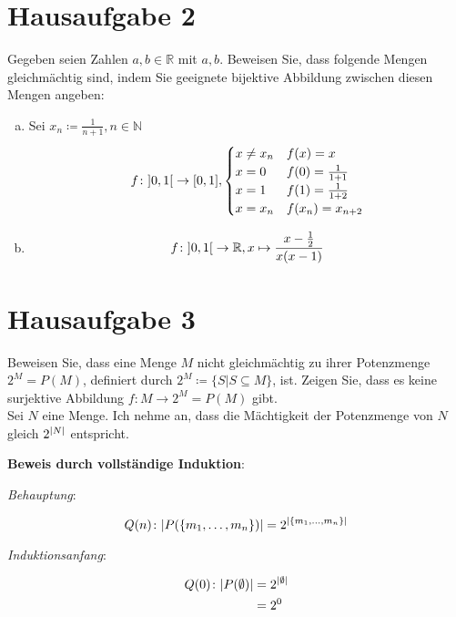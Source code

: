 \documentclass{article}
\begin{document}
\section*{Hausaufgabe 2}

Gegeben seien Zahlen $a, b \in \mathbb{R}$ mit $a , b$. Beweisen Sie, dass folgende Mengen gleichmächtig sind, indem
Sie geeignete bijektive Abbildung zwischen diesen Mengen angeben:

\begin{enumerate}[a)]
\item
  Sei $x_n \coloneqq \frac{1}{n+1}, n \in \mathbb{N}$
  \[
    f \colon \interval[open]{0}{1} \to \interval{0}{1}, \begin{cases}
      x \ne x_n & f(x) = x \\
      x = 0 & f(0) = \frac{1}{1 + 1} \\
      x = 1 & f(1) = \frac{1}{1 + 2} \\
      x = x_n & f(x_n) = x_{n+2}
    \end{cases}
  \]
\item
  \[
    f \colon \interval[open]{0}{1} \to \mathbb{R}, x \mapsto \frac{x-\frac{1}{2}}{x(x - 1)}
  \]
\end{enumerate}


\section*{Hausaufgabe 3}

Beweisen Sie, dass eine Menge $M$ nicht gleichmächtig zu ihrer Potenzmenge $2^M = P(M)$, definiert durch
$2^M \coloneqq \{ S | S \subseteq M \}$, ist. Zeigen Sie, dass es keine surjektive Abbildung
$f \colon M \to 2^M = P(M)$ gibt. \\

Sei $N$ eine Menge. Ich nehme an, dass die Mächtigkeit der Potenzmenge von $N$ gleich $2^{\abs{N}}$ entspricht.

\textbf{Beweis durch vollständige Induktion}:

\emph{Behauptung}:

\[
  Q(n) \colon \abs{P(\{m_1, \ldots, m_n\})} = 2^{\abs{\{m_1, \ldots, m_n\}}}
\]

\emph{Induktionsanfang}:

\begin{align*}
  Q(0) \colon \abs{P(\emptyset)} &= 2^{\abs{\emptyset}} \\
                                 &= 2^0 \\
\end{align*}
\end{document}
